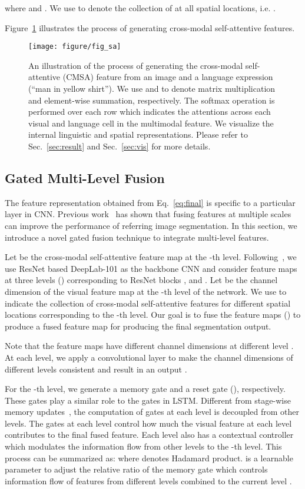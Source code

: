 \documentclass[10pt,twocolumn,letterpaper]{article}
\begin{document}
where  and . We use  to denote the collection of  at all spatial locations, i.e. .

Figure~\ref{fig:nl} illustrates the process of generating cross-modal self-attentive features. 

\begin{figure}[htb]
  \centering
  \texttt{[image: figure/fig\_sa]}
    \caption{An illustration of the process of generating the cross-modal self-attentive (CMSA) feature from an image and a language expression (``man in yellow shirt''). We use  and  to denote matrix multiplication and element-wise summation, respectively. The softmax operation is performed over each row which indicates the attentions across each visual and language cell in the multimodal feature. We visualize the internal linguistic and spatial representations. Please refer to Sec.~\ref{sec:result} and Sec.~\ref{sec:vis} for more details.}
\label{fig:nl}
\end{figure}


\subsection{Gated Multi-Level Fusion}\label{sec:gf}
The feature representation  obtained from Eq.~\ref{eq:final} is specific to a particular layer in CNN. Previous work~\cite{li2018referring} has shown that fusing features at multiple scales can improve the performance of referring image segmentation. In this section, we introduce a novel gated fusion technique to integrate multi-level features.

Let  be the cross-modal self-attentive feature map at the -th level. Following~\cite{li2018referring}, we use ResNet based DeepLab-101 as the backbone CNN and consider feature maps at three levels () corresponding to ResNet blocks ,  and . Let  be the channel dimension of the visual feature map at the -th level of the network. We use  to indicate the collection of cross-modal self-attentive features  for different spatial locations corresponding to the -th level. Our goal is to fuse the feature maps  () to produce a fused feature map for producing the final segmentation output.

Note that the feature maps   have different channel dimensions at different level . At each level, we apply a  convolutional layer to make the channel dimensions of different levels consistent and result in an output .


For the -th level, we generate a memory gate  and a reset gate  (), respectively. These gates play a similar role to the gates in LSTM. Different from stage-wise memory updates~\cite{cho2014learning,hochreiter1997long}, the computation of gates at each level is decoupled from other levels. The gates at each level control how much the visual feature at each level contributes to the final fused feature. Each level also has a contextual controller  which modulates the information flow from other levels to the -th level. This process can be summarized as: 
where  denotes Hadamard product.  is a learnable parameter to adjust the relative ratio of the memory gate which controls information flow of features from different levels  combined to the current level . 
\end{document}

